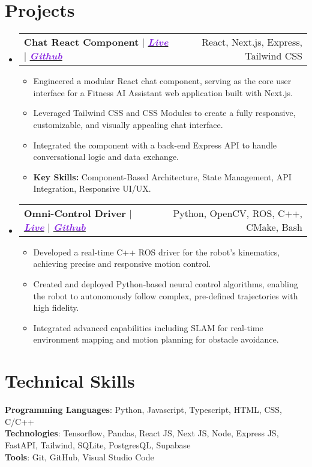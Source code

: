 \documentclass[a4paper,11pt]{article}
\makeatletter
\newcommand{\resumeItem}[1]{
  \item\small{
    {#1 \vspace{-2pt}}
  }
}
\newcommand{\resumeProjectHeading}[2]{
    \item
    \begin{tabular*}{1\textwidth}{l@{\extracolsep{\fill}}r}
      \small#1 & #2 \\
    \end{tabular*}\vspace{-7pt}
}
\newcommand{\resumeSubHeadingListStart}{\begin{itemize}[leftmargin=0in, label={}]}
\newcommand{\resumeSubHeadingListEnd}{\end{itemize}}
\newcommand{\resumeItemListStart}{\begin{itemize}[leftmargin=0.15in, nosep]}
\newcommand{\resumeItemListEnd}{\end{itemize}\vspace{-2pt}}
\makeatother
\begin{document}
\section{\Large{Projects}}
\resumeSubHeadingListStart
\resumeProjectHeading
{\textbf{\large{Chat React Component}} $|$ \emph{\href{https://lep-chat-demo.vercel.app/}{\textcolor{BlueViolet}{\textbf{Live}}}} $|$ \emph{\href{https://github.com/lepcodes/lep-chat}{\textcolor{BlueViolet}{\textbf{Github}}}}}{React, Next.js, Express, Tailwind CSS}
\resumeItemListStart
\resumeItem{Engineered a modular React chat component, serving as the core user interface for a Fitness AI Assistant web application built with Next.js.}
\resumeItem{Leveraged Tailwind CSS and CSS Modules to create a fully responsive, customizable, and visually appealing chat interface.}
\resumeItem{Integrated the component with a back-end Express API to handle conversational logic and data exchange.}
\resumeItem{\textbf{Key Skills:} Component-Based Architecture, State Management, API Integration, Responsive UI/UX.}
\resumeItemListEnd
\resumeProjectHeading
{\textbf{\large{Omni-Control Driver}} $|$ \emph{\href{https://www.youtube.com/watch?v=NT2HuSaO69o/}{\textcolor{BlueViolet}{\textbf{Live}}}} $|$ \emph{\href{https://github.com/lepcodes/omni_control/}{\textcolor{BlueViolet}{\textbf{Github}}}}}{Python, OpenCV, ROS, C++, CMake, Bash}
\resumeItemListStart
\resumeItem{Developed a real-time C++ ROS driver for the robot's kinematics, achieving precise and responsive motion control.}
\resumeItem{Created and deployed Python-based neural control algorithms, enabling the robot to autonomously follow complex, pre-defined trajectories with high fidelity.}
\resumeItem{Integrated advanced capabilities including SLAM for real-time environment mapping and motion planning for obstacle avoidance.}
\resumeItemListEnd
\resumeSubHeadingListEnd

\vspace{-14pt}
\section{\Large{Technical Skills}}
 \begin{itemize}[leftmargin=0.15in, label={}]
    \small{\item{
     \textbf{Programming Languages}{: Python, Javascript, Typescript, HTML, CSS, C/C++} \\
     \textbf{Technologies}{: Tensorflow, Pandas, React JS, Next JS, Node, Express JS, FastAPI, Tailwind, SQLite, PostgresQL, Supabase}  \\
     \textbf{Tools}{: Git, GitHub, Visual Studio Code} \\
    }}
 \end{itemize}
\end{document}

